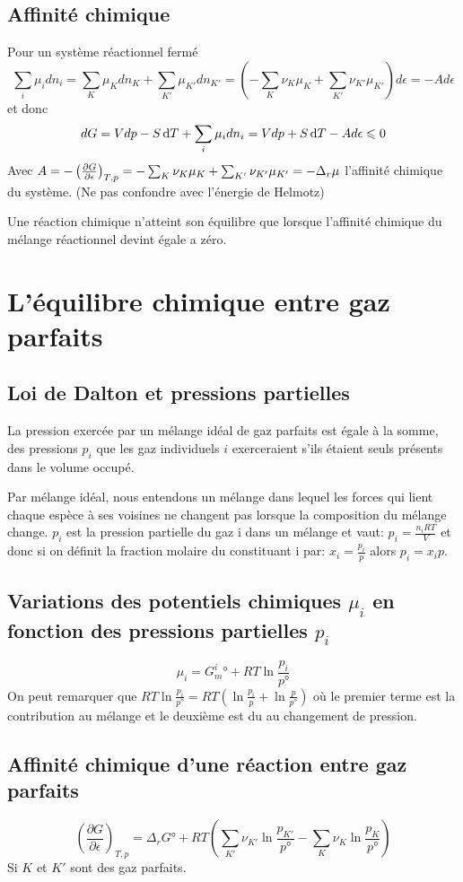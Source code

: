 \subsection{Affinité chimique}
Pour un système réactionnel fermé
\[ \sum_i\mu_idn_i = \sum_K\mu_Kdn_K+\sum_{K'}\mu_{K'}dn_{K'} =
\left(-\sum_K\nu_K\mu_K+\sum_{K'}\nu_{K'}\mu_{K'}\right)d\epsilon =
-Ad\epsilon \]
et donc
\[ dG = Vdp-S\operatorname{d}\! T +\sum_i\mu_idn_i = Vdp+S\operatorname{d}\! T-Ad\epsilon \leqslant 0 \]
Avec $A = -\left(\frac{\partial G}{\partial \epsilon}\right)_{T,p} =
-\sum_K\nu_K\mu_K+\sum_{K'}\nu_{K'}\mu_{K'} = -\Delta_r \mu$
l'affinité chimique du système.
(Ne pas confondre avec l'énergie de Helmotz)

Une réaction chimique n'atteint son équilibre que lorsque
l'affinité chimique du mélange réactionnel devint égale a zéro.

\section{L'équilibre chimique entre gaz parfaits}
\subsection{Loi de Dalton et pressions partielles}
La pression exercée par un mélange idéal de gaz parfaits est égale à la somme,
des pressions $p_i$ que les gaz individuels
$i$ exerceraient s'ils étaient seuls présents dans le volume occupé.

Par mélange idéal,
nous entendons un mélange dans lequel les forces qui lient chaque espèce
à ses voisines ne changent pas lorsque la composition du mélange change.
$p_i$ est la pression partielle du gaz i dans un mélange et vaut:
$p_i = \frac{n_iRT}{V}$ et donc si on définit la fraction molaire
du constituant i par: $x_i = \frac{p_i}{p}$ alors $p_i = x_ip$.

\subsection{Variations des potentiels chimiques $\mu_i$
en fonction des pressions partielles $p_i$}
\[ \mu_i = G_m^i°+RT \ln \frac{p_i}{p°} \]
On peut remarquer que $RT \ln \frac{p_i}{p°} =
RT \left(\ln \frac{p_i}{p} + \ln \frac{p}{p°}\right)$
où le premier terme est la contribution au mélange et
le deuxième est du au changement de pression.

\subsection{Affinité chimique d'une réaction entre gaz parfaits}
\[ \left(\frac {\partial G}{\partial \epsilon}\right)_{T,p} =
\Delta_rG°+RT\left(\sum_{K'}\nu_{K'} \ln \frac{p_{K'}}{p°}-
\sum_{K}\nu_{K} \ln \frac{p_{K}}{p°}\right) \]
Si $K$ et $K'$ sont des gaz parfaits.

